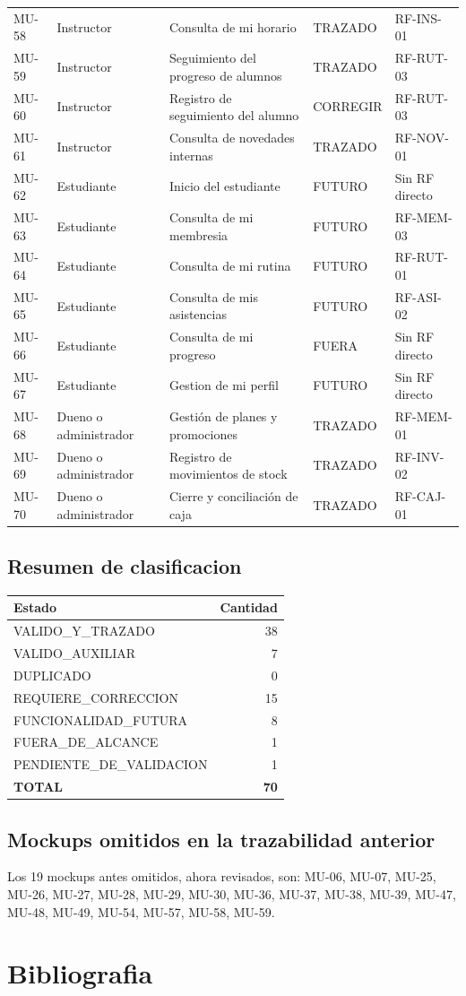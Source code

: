 \documentclass[11pt,a4paper,twoside]{article}
\begin{document}
\begin{longtable}{p{1.0cm}p{2.7cm}p{3.0cm}p{3.1cm}p{2.8cm}}
MU-58 & Instructor & Consulta de mi horario & TRAZADO & RF-INS-01 \\
MU-59 & Instructor & Seguimiento del progreso de alumnos & TRAZADO & RF-RUT-03 \\
MU-60 & Instructor & Registro de seguimiento del alumno & CORREGIR & RF-RUT-03 \\
MU-61 & Instructor & Consulta de novedades internas & TRAZADO & RF-NOV-01 \\
MU-62 & Estudiante & Inicio del estudiante & FUTURO & Sin RF directo \\
MU-63 & Estudiante & Consulta de mi membresia & FUTURO & RF-MEM-03 \\
MU-64 & Estudiante & Consulta de mi rutina & FUTURO & RF-RUT-01 \\
MU-65 & Estudiante & Consulta de mis asistencias & FUTURO & RF-ASI-02 \\
MU-66 & Estudiante & Consulta de mi progreso & FUERA & Sin RF directo \\
MU-67 & Estudiante & Gestion de mi perfil & FUTURO & Sin RF directo \\
MU-68 & Dueno o administrador & Gestión de planes y promociones & TRAZADO & RF-MEM-01 \\
MU-69 & Dueno o administrador & Registro de movimientos de stock & TRAZADO & RF-INV-02 \\
MU-70 & Dueno o administrador & Cierre y conciliación de caja & TRAZADO & RF-CAJ-01 \\
\bottomrule
\end{longtable}
\normalsize

\subsection{Resumen de clasificacion}
\begin{tabularx}{\textwidth}{Xr}
\toprule Estado & Cantidad \\ \midrule
VALIDO\_Y\_TRAZADO & 38 \\
VALIDO\_AUXILIAR & 7 \\
DUPLICADO & 0 \\
REQUIERE\_CORRECCION & 15 \\
FUNCIONALIDAD\_FUTURA & 8 \\
FUERA\_DE\_ALCANCE & 1 \\
PENDIENTE\_DE\_VALIDACION & 1 \\
\midrule
\textbf{TOTAL} & \textbf{70} \\
\bottomrule
\end{tabularx}
\subsection{Mockups omitidos en la trazabilidad anterior}
Los 19 mockups antes omitidos, ahora revisados, son: MU-06, MU-07, MU-25, MU-26, MU-27, MU-28, MU-29, MU-30, MU-36, MU-37, MU-38, MU-39, MU-47, MU-48, MU-49, MU-54, MU-57, MU-58, MU-59.

\section{Bibliografia}


\end{document}
